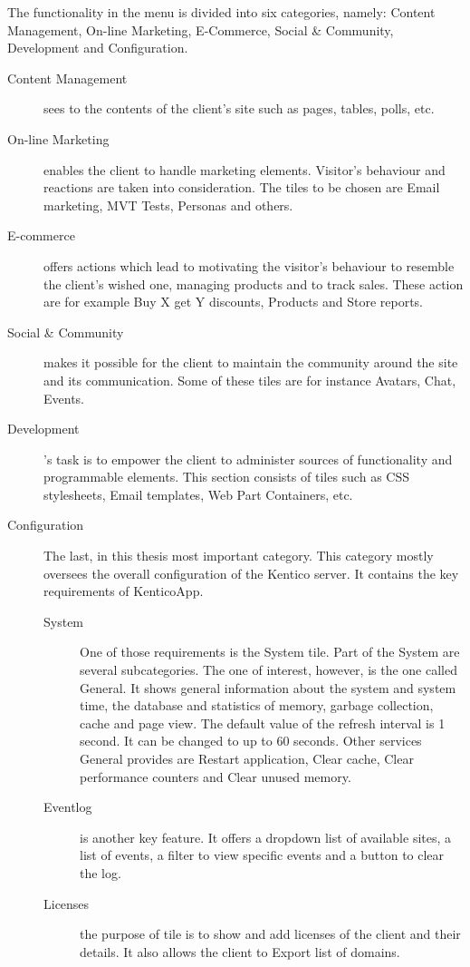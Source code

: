 The functionality in the menu is divided into six categories, namely: Content Management, On-line Marketing, E-Commerce, Social \& Community, Development and Configuration. 
\begin{description}
\item [Content Management] sees to the contents of the client's site such as pages, tables, polls, etc. 
\item [On-line Marketing] enables the client to handle marketing elements. Visitor's behaviour and reactions are taken into consideration. The tiles to be chosen are Email marketing, MVT Tests, Personas and others. 
\item [E-commerce] offers actions which lead to motivating the visitor's behaviour to resemble the client's wished one, managing products and to track sales. These action are for example Buy X get Y discounts, Products and Store reports. 
\item [Social \& Community] makes it possible for the client to maintain the community around the site and its communication. Some of these tiles are for instance Avatars, Chat, Events. 
\item [Development]'s task is to empower the client to administer sources of functionality and programmable elements. This section consists of tiles such as CSS stylesheets, Email templates, Web Part Containers, etc. 
\item [Configuration] The last, in this thesis most important category. This category mostly oversees the overall configuration of the Kentico server. It contains the key requirements of KenticoApp.
	\begin {description}
	\item [System] One of those requirements is the System tile. Part of the System are several subcategories. The one of interest, however, is the one called General. It shows general information about the system and system time, the database and statistics of memory, garbage collection, cache and page view. The default value of the refresh interval is 1 second. It can be changed to up to 60 seconds. Other services General provides are Restart application, Clear cache, Clear performance counters and Clear unused memory. 
	\item [Eventlog] is another key feature. It offers a dropdown list of available sites, a list of events, a filter to view specific events and a button to clear the log. 
	\item[Licenses] the purpose of tile is to show and add licenses of the client and their details. It also allows the client to Export list of domains. 

\end{description}
\end{description}
